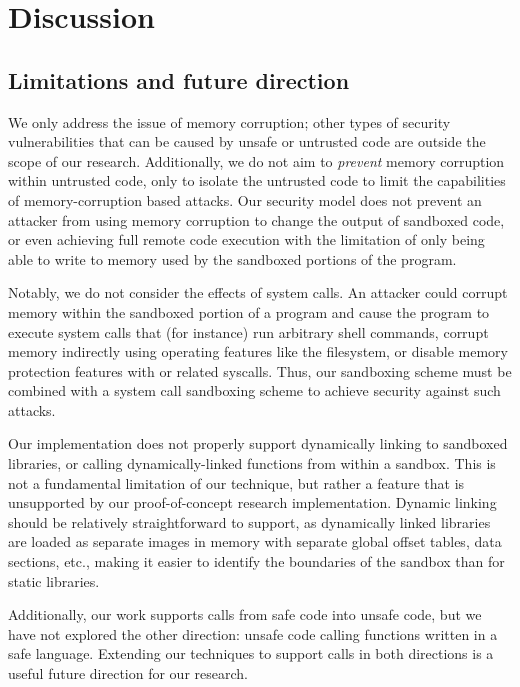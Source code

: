 \chapter{Discussion}

\section{Limitations and future direction}

We only address the issue of memory corruption; other types of security vulnerabilities that can be
caused by unsafe or untrusted code are outside the scope of our research. Additionally, we do not
aim to \textit{prevent} memory corruption within untrusted code, only to isolate the untrusted code
to limit the capabilities of memory-corruption based attacks. Our security model does not prevent an
attacker from using memory corruption to change the output of sandboxed code, or even achieving full
remote code execution with the limitation of only being able to write to memory used by the
sandboxed portions of the program.

Notably, we do not consider the effects of system calls. An attacker could corrupt memory within the
sandboxed portion of a program and cause the program to execute system calls that (for instance) run
arbitrary shell commands, corrupt memory indirectly using operating features like the 
filesystem, or disable memory protection features with  or related syscalls. Thus,
our sandboxing scheme must be combined with a system call sandboxing scheme to achieve security
against such attacks.

Our implementation does not properly support dynamically linking to sandboxed libraries, or calling
dynamically-linked functions from within a sandbox. This is not a fundamental limitation of our
technique, but rather a feature that is unsupported by our proof-of-concept research implementation.
Dynamic linking should be relatively straightforward to support, as dynamically linked libraries are
loaded as separate images in memory with separate global offset tables, data sections, etc., making
it easier to identify the boundaries of the sandbox than for static libraries.

Additionally, our work supports calls from safe code into unsafe code, but we have not explored the
other direction: unsafe code calling functions written in a safe language. Extending our techniques
to support calls in both directions is a useful future direction for our research.

